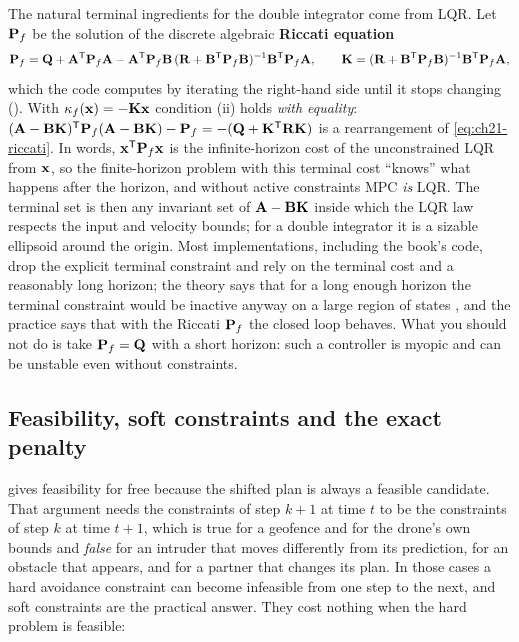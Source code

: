 The natural terminal ingredients for the double integrator come from LQR. Let
$\mathbf{P}_f$ be the solution of the discrete algebraic \textbf{Riccati
equation}
\begin{equation}
\mathbf{P}_f=\mathbf{Q}+\mathbf{A}^{\mathsf{T}}\mathbf{P}_f\mathbf{A}-\mathbf{A}^{\mathsf{T}}\mathbf{P}_f\mathbf{B}\,(\mathbf{R}+\mathbf{B}^{\mathsf{T}}\mathbf{P}_f\mathbf{B})^{-1}\mathbf{B}^{\mathsf{T}}\mathbf{P}_f\mathbf{A},
\qquad \mathbf{K}=(\mathbf{R}+\mathbf{B}^{\mathsf{T}}\mathbf{P}_f\mathbf{B})^{-1}\mathbf{B}^{\mathsf{T}}\mathbf{P}_f\mathbf{A},
\label{eq:ch21-riccati}
\end{equation}
which the code computes by iterating the right-hand side until it stops
changing (). With $\kappa_f(\mathbf{x})=-\mathbf{K}\mathbf{x}$ condition (ii)
holds \emph{with equality}: $(\mathbf{A}-\mathbf{B}\mathbf{K})^{\mathsf{T}}\mathbf{P}_f(\mathbf{A}-\mathbf{B}\mathbf{K})-\mathbf{P}_f=-(\mathbf{Q}+\mathbf{K}^{\mathsf{T}}\mathbf{R}\mathbf{K})$
is a rearrangement of \cref{eq:ch21-riccati}. In words, $\mathbf{x}^{\mathsf{T}}\mathbf{P}_f\mathbf{x}$
is the infinite-horizon cost of the unconstrained LQR from $\mathbf{x}$, so the
finite-horizon problem with this terminal cost ``knows'' what happens after
the horizon, and without active constraints MPC \emph{is} LQR. The terminal set
is then any invariant set of $\mathbf{A}-\mathbf{B}\mathbf{K}$ inside which the LQR law
respects the input and velocity bounds; for a double integrator it is a
sizable ellipsoid around the origin. Most implementations, including the
book's code, drop the explicit terminal constraint and rely on the terminal
cost and a reasonably long horizon; the theory says that for a long enough
horizon the terminal constraint would be inactive anyway on a large region
of states \cite{rawlings2017mpc}, and the practice says that with the Riccati
$\mathbf{P}_f$ the closed loop behaves. What you should not do is take
$\mathbf{P}_f=\mathbf{Q}$ with a short horizon: such a controller is myopic and can be
unstable even without constraints.

\subsection{Feasibility, soft constraints and the exact penalty}

 gives feasibility for free because the shifted plan is
always a feasible candidate. That argument needs the constraints of step
$k+1$ at time $t$ to be the constraints of step $k$ at time $t+1$, which is
true for a geofence and for the drone's own bounds and \emph{false} for an
intruder that moves differently from its prediction, for an obstacle that
appears, and for a partner that changes its plan. In those cases a hard
avoidance constraint can become infeasible from one step to the next, and
soft constraints are the practical answer. They cost nothing when the hard
problem is feasible:

